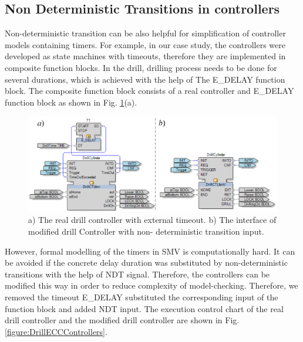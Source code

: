 \begin{bibunit}
\subsection{Non Deterministic Transitions in controllers}

Non-deterministic transition can be also helpful for simplification of controller models containing timers. For example, in our case study, the controllers were developed as state machines with timeouts, therefore they are implemented in composite function blocks. In the drill, drilling process needs to be done for several durations, which is achieved  with the help of The E\_DELAY function block. The composite function block consists of a real controller and E\_DELAY function block as shown in Fig. \ref{figure:DrillInterfaceControllers}(a). 

\begin{figure}
    \centering
    \includegraphics[scale = 0.33]{MX_Papers/Paper2/images/Fig9.png}
    \caption{ a) The real drill controller with external timeout. b) The interface of modified drill Controller with non- deterministic transition input.}
    \label{figure:DrillInterfaceControllers}
\end{figure}

However, formal modelling of the timers in SMV is computationally hard. It can be avoided if the concrete delay duration was substituted by non-deterministic transitions with the help of NDT signal. Therefore, the controllers can be modified this way in order to reduce complexity of model-checking. Therefore, we removed the timeout E\_DELAY substituted the corresponding input of the function  block and added NDT input. The execution control chart of the real drill controller and the modified drill controller are shown in Fig. \ref{figure:DrillECCControllers}.


\end{bibunit}
